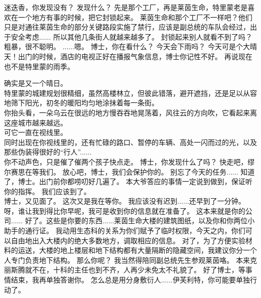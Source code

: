 \documentclass[openany]{book}
\begin{document}
\begin{dialogue}
     迷迭香，你发现没有？
     发现什么？
     先是那个工厂，再是莱茵生命，特里蒙老是喜欢在一个地方有事的时候，把它封锁起来。
     莱茵生命和那个工厂不一样吧？他们只是对通往莱茵生命的部分关键路段实施了禁行，应该是副总统的车队会经过，出于安全考虑......
     所以其他几条街人就越来越多了。
     封锁起来别人就看不到了吗？粗暴，很不聪明。
     ......嗯。
     博士，你在看什么？
     今天会下雨吗？
     今天可是个大晴天！出门的时候，酒店的电视正好在播报气象信息，博士你记性不好。
     再说现在也不是特里蒙的雨季。\par
    确实是又一个晴日。\\
    特里蒙的城建规划很精细，虽然高楼林立，但彼此错落，避开遮挡，还是足以从容地筛下阳光，初冬的暖阳均匀地涂抹着每一条街。\\
    你抬头看，一朵乌云在很远的地方慢吞吞地晃荡着，风往云的方向吹，它看起来离这座城市越来越远。\\
    可它一直在视线里。\\
    同时出现在你视线里的，还有忙碌的路口、暂停的车辆、高处一闪而过的光，以及那些伪装得很好的“行人”......\\
    你不动声色，只是催了催两个孩子快点走。
     博士，你发现什么了吗？
     快走吧，缪尔赛思在等我们。
     放心吧，博士，我们会保护你的。
     别忘了今天的任务......
     知道了，博士。出门前你都唠叨好几遍了。
     本大爷答应的事情一定说到做到，保证听你的指挥。
     我们应该到了。
    \\
     博士，又见面了。
     这次又是我在等你。
     我应该没有迟到......还早到了一分钟。
     呀，谁让我到得比你早呢，我可是收到你的信息就在准备了。
     这本来就是你的公司......
     好了。这些是你要的东西......莱茵生命大楼的建筑图纸，以及你和你两位小助手的通行证。
     我动用生态科的关系为你们赋予了临时权限，今天之内，你们可以自由地出入大楼内的绝大多数地方，调取相应的信息。
     对了，为了方便实验材料的运送，大楼的地上楼层和地下结构都有大量隔断的隐藏空间，我建议你分一个人专门负责地下结构。
     那么你呢？
     我当然得陪同副总统先生参观莱茵咯。
     本来克丽斯腾就不在，十科的主任也到不齐，人再少未免太不礼貌了。
     好了博士，等事情结束，我再单独答谢你。
     怎么总是用分身敷衍人......伊芙利特，你可能要单独行动了。
\end{dialogue}
\end{document}

